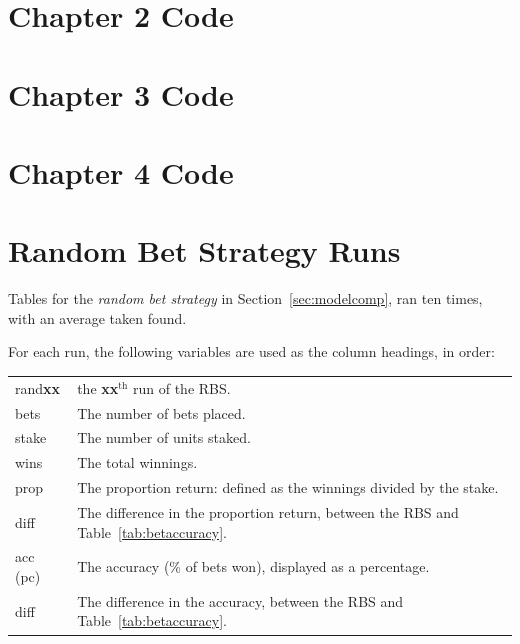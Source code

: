 \documentclass[a4paper,10pt]{report}
\begin{document}
\chapter{Chapter 2 Code}\label{app:chap2code} 	
\chapter{Chapter 3 Code}\label{app:chap3code}	
\chapter{Chapter 4 Code}\label{app:chap4code}	

\chapter{Random Bet Strategy Runs}\label{app:rbsruns}
Tables for the \textit{random bet strategy} in Section~\ref{sec:modelcomp}, ran ten times, with an average taken found.\vspace{3mm}

\noindent For each run, the following variables are used as the column headings, in order:

\begin{tabular}{ll}
rand\textbf{xx} & the \textbf{xx}$^{\textrm{th}}$ run of the RBS.\\
bets & The number of bets placed.\\
stake & The number of units staked.\\
wins & The total winnings. \\
prop & The proportion return: defined as the winnings divided by the stake.\\
diff & The difference in the proportion return, between the RBS and Table~\ref{tab:betaccuracy}.\\
acc (pc) & The accuracy (\% of bets won), displayed as a percentage.\\
diff & The difference in the accuracy, between the RBS and Table~\ref{tab:betaccuracy}.
\end{tabular}
\end{document}
